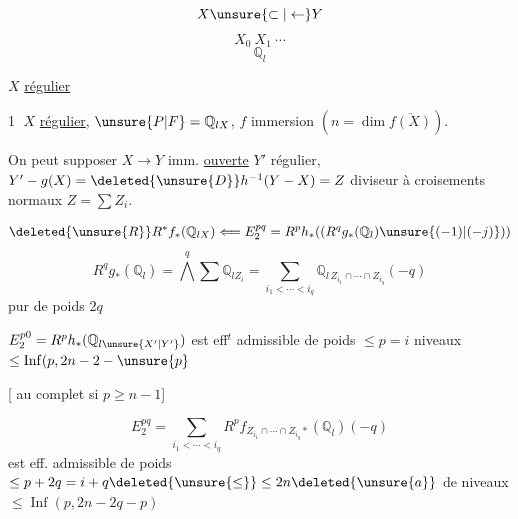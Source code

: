 
\[
X\unsure{\subset|\leftarrow}Y
\]
\[
X_0\ X_1\ \cdots
\]
\[
\mathbb Q_l
\]

$X$ \uline{régulier}




\textcircled{1} $X$ \uline{régulier}, $\unsure{P|F}=\mathbb Q_{lX}$, $f$ immersion $(n=\dim\overline{f(X)})$.

On peut supposer $X\longrightarrow Y$ imm. \uline{ouverte}
$Y'$ régulier, $Y'-g(X)=\deleted{\unsure{D}}h^{-1}(Y-X)=Z$ diviseur à croisements normaux $Z=\sum Z_i$.

\[
\deleted{\unsure{R}}R^*f_*(\mathbb Q_{lX})\Longleftarrow E^{pq}_2
=R^ph_*((R^qg_*(\mathbb Q_l)\unsure{(-1)|(-j)}))
\]
\[
R^qg_*(\mathbb Q_l)=\bigwedge^q\sum\mathbb Q_{lZ_i}
=\sum_{i_1<\cdots<i_q}\mathbb Q_{l\,Z_{i_1}\cap\cdots\cap Z_{i_q}}(-q)
\]
pur de poids $2q$


$E^{p0}_2=R^ph_*(\mathbb Q_{l\unsure{X'|Y'}})$ est eff$^{t}$ admissible de poids $\leq p=i$ niveaux $\leq\operatorname{Inf}(p,2n-2-\unsure{p}$

[ au complet si $p\geq n-1$]

\[
E^{pq}_2=\sum_{i_1<\cdots<i_q}R^pf_{Z_{i_1}\cap\cdots\cap Z_{i_q}*}(\mathbb Q_l)(-q)
\]
est eff. admissible de poids $\leq p+2q=i+q\deleted{\unsure{\leq}}\leq2n\deleted{\unsure{a}}$
de niveaux $\leq\operatorname{Inf}(p,2n-2q-p)$

